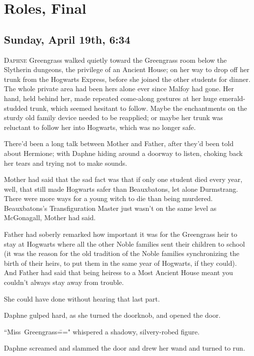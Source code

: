 \chapter{Roles, Final}

\section{Sunday, April 19th, 6:34\pm}

\lettrine{D}{aphne} Greengrass walked quietly toward the Greengrass room below the Slytherin dungeons, the privilege of an Ancient House; on her way to drop off her trunk from the Hogwarts Express, before she joined the other students for dinner. The whole private area had been hers alone ever since Malfoy had gone. Her hand, held behind her, made repeated come-along gestures at her huge emerald-studded trunk, which seemed hesitant to follow. Maybe the enchantments on the sturdy old family device needed to be reapplied; or maybe her trunk was reluctant to follow her into Hogwarts, which was no longer safe.

There'd been a long talk between Mother and Father, after they'd been told about Hermione; with Daphne hiding around a doorway to listen, choking back her tears and trying not to make sounds.

Mother had said that the sad fact was that if only one student died every year, well, that still made Hogwarts safer than Beauxbatons, let alone Durmstrang. There were more ways for a young witch to die than being murdered. Beauxbatons's Transfiguration Master just wasn't on the same level as McGonagall, Mother had said.

Father had soberly remarked how important it was for the Greengrass heir to stay at Hogwarts where all the other Noble families sent their children to school (it was the reason for the old tradition of the Noble families synchronizing the birth of their heirs, to put them in the same year of Hogwarts, if they could). And Father had said that being heiress to a Most Ancient House meant you couldn't always stay away from trouble.

She could have done without hearing that last part.

Daphne gulped hard, as she turned the doorknob, and opened the door.

``Miss~Greengrass\===" whispered a shadowy, silvery-robed figure.

Daphne screamed and slammed the door and drew her wand and turned to run.

